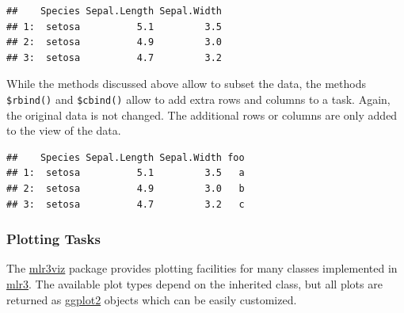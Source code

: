 \documentclass[]{article}
\newenvironment{Shaded}{\begin{snugshade}}{\end{snugshade}}
\newcommand{\CommentTok}[1]{\textcolor[rgb]{0.56,0.35,0.01}{\textit{#1}}}
\newcommand{\DataTypeTok}[1]{\textcolor[rgb]{0.13,0.29,0.53}{#1}}
\newcommand{\DecValTok}[1]{\textcolor[rgb]{0.00,0.00,0.81}{#1}}
\newcommand{\KeywordTok}[1]{\textcolor[rgb]{0.13,0.29,0.53}{\textbf{#1}}}
\newcommand{\NormalTok}[1]{#1}
\newcommand{\OperatorTok}[1]{\textcolor[rgb]{0.81,0.36,0.00}{\textbf{#1}}}
\newcommand{\StringTok}[1]{\textcolor[rgb]{0.31,0.60,0.02}{#1}}
\renewenvironment{Shaded} {\begin{snugshade}\small} {\end{snugshade}}
\begin{document}
\begin{Shaded}
\end{Shaded}

\begin{verbatim}
##    Species Sepal.Length Sepal.Width
## 1:  setosa          5.1         3.5
## 2:  setosa          4.9         3.0
## 3:  setosa          4.7         3.2
\end{verbatim}

While the methods discussed above allow to subset the data, the methods \texttt{\$rbind()} and \texttt{\$cbind()} allow to add extra rows and columns to a task.
Again, the original data is not changed.
The additional rows or columns are only added to the view of the data.

\begin{Shaded}
\end{Shaded}

\begin{verbatim}
##    Species Sepal.Length Sepal.Width foo
## 1:  setosa          5.1         3.5   a
## 2:  setosa          4.9         3.0   b
## 3:  setosa          4.7         3.2   c
\end{verbatim}

\hypertarget{autoplot-task}{%
\subsubsection{Plotting Tasks}\label{autoplot-task}}

The \href{https://mlr3viz.mlr-org.com}{mlr3viz} package provides plotting facilities for many classes implemented in \href{https://mlr3.mlr-org.com}{mlr3}.
The available plot types depend on the inherited class, but all plots are returned as \href{https://cran.r-project.org/package=ggplot2}{ggplot2} objects which can be easily customized.
\end{document}
